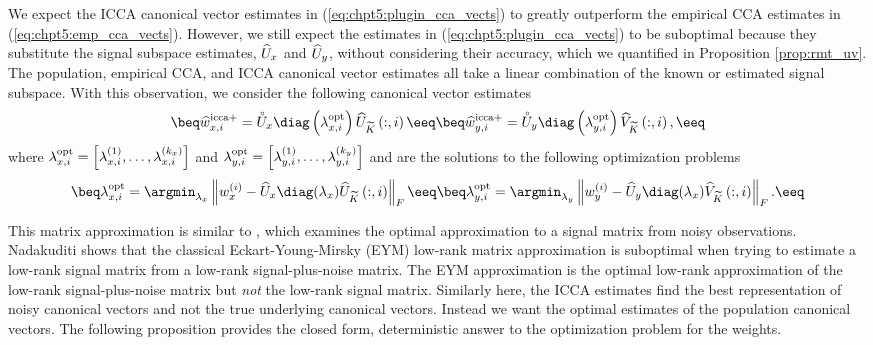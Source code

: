 \section{\iccap}\label{sec:chpt5:iccap}
We expect the ICCA canonical vector estimates in (\ref{eq:chpt5:plugin_cca_vects}) to
greatly outperform the empirical CCA estimates in (\ref{eq:chpt5:emp_cca_vects}). However,
we still expect the estimates in (\ref{eq:chpt5:plugin_cca_vects}) to be suboptimal
because they substitute the signal subspace estimates, $\widehat{U}_x$ and $\widehat{U}_y$, without
considering their accuracy, which we quantified in Proposition \ref{prop:rmt_uv}. The
population, empirical CCA, and ICCA canonical vector estimates all take a linear
combination of the known or estimated signal subspace. With this observation, we consider
the following canonical vector estimates
\begin{subequations}\label{eq:chpt5:opt_cca_vects} 
\beq
\widehat{w}_{x,i}^{\text{icca+}} = \Uxcir\diag\left(\lambda_{x,i}^{\text{opt}}\right)\Uktilhat\left(:,i\right)
\eeq
\beq
\widehat{w}_{y,i}^{\text{icca+}} = \Uycir\diag\left(\lambda_{y,i}^{\text{opt}}\right)\Vktilhat\left(:,i\right),
\eeq
\end{subequations}
where 
$\lambda_{x,i}^{\text{opt}}=\left[\lambda_{x,i}^{(1)},\dots,\lambda_{x,i}^{(k_x)}\right]$ and
$\lambda_{y,i}^{\text{opt}}=\left[\lambda_{y,i}^{(1)},\dots,\lambda_{y,i}^{(k_y)}\right]$ and are the
solutions to the following optimization problems
\begin{subequations}\label{eq:chpt5:can_vec_opt_prob}
\beq
\lambda_{x,i}^{\text{opt}} = \argmin_{\lambda_x}\left\|w_x^{(i)} -
  \Uxhat\diag(\lambda_x)\Uktilhat\left(:,i\right)\right\|_F
\eeq
\beq
\lambda_{y,i}^{\text{opt}} = \argmin_{\lambda_y}\left\|w_y^{(i)} -
  \Uyhat\diag(\lambda_x)\Vktilhat\left(:,i\right)\right\|_F.
\eeq
\end{subequations}

This matrix approximation is similar to \cite{nadakuditi2014optshrink}, which examines the
optimal approximation to a signal matrix from noisy observations. Nadakuditi shows that
the classical Eckart-Young-Mirsky (EYM) low-rank matrix approximation is suboptimal when
trying to estimate a low-rank signal matrix from a low-rank signal-plus-noise matrix. The
EYM approximation is the optimal low-rank approximation of the low-rank signal-plus-noise
matrix but \textit{not} the low-rank signal matrix. Similarly here, the ICCA estimates
find the best representation of noisy canonical vectors and not the true underlying
canonical vectors. Instead we want the optimal estimates of the population canonical
vectors. The following proposition provides the closed form, deterministic answer to the
optimization problem for the \iccap weights.

